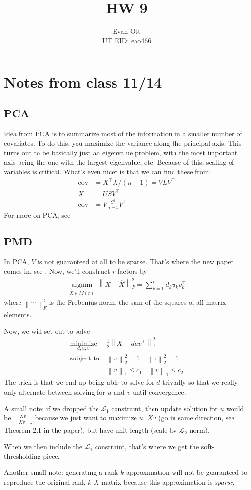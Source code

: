 \documentclass{article}
\title{\vspace{-6ex}HW 9\vspace{-2ex}}
\author{Evan Ott \\ UT EID: eao466\vspace{-2ex}}
\newcommand{\op}[2]{{\ensuremath{\underset{ #2 }{\operatorname{ #1 }}~}}}
\newcommand{\norm}[1]{{ \ensuremath{ \left\lVert  #1 \right\rVert  }  }}
\newcommand{\cov}{ \ensuremath{ \textrm{cov} } }
\begin{document}
\maketitle

\section{Notes from class 11/14}
\subsection{PCA}
Idea from PCA is to summarize most of the information in a smaller number of covariates. To do this,
you maximize the variance along the principal axis. This turns out to be basically just an eigenvalue problem,
with the most important axis being the one with the largest eigenvalue, etc. Because of this, scaling of variables
is critical. What's even nicer is that we can find these from:
\begin{align*}
\cov &= X^\top X / (n-1) = V L V^\top\\
X&=USV^\top\\
\cov &= V \frac{S^2}{n-1} V^\top
\end{align*}
For more on PCA, see \cite{james2013introduction}


\subsection{PMD}
In PCA, $V$ is not guaranteed at all to be sparse. 
That's where the new paper comes in, see \cite{witten2009penalized}.
Now, we'll construct $r$ factors by
\begin{align*}
\op{argmin}{\hat{X}\in M(r)}\norm{X-\hat{X}}_F^2 = \sum_{k=1}^r d_k u_k v_k^\top
\end{align*}
where $\norm{\cdots}_F^2$ is the Frobenius norm, the sum of the squares of all matrix elements.

Now, we will set out to solve
\begin{align*}
\op{minimize}{d,u,v} &\frac12 \norm{X-duv^\top}_F^2\\
\textrm{subject to} ~&\norm{u}_2^2=1~~~~\norm{v}_2^2=1\\
&\norm{u}_1\leq c_1~~~~\norm{v}_1\leq c_2
\end{align*}
The trick is that we end up being able to solve for $d$ trivially so that we really only alternate between solving for $u$ and $v$ until convergence.

A small note: if we dropped the $\mathcal{L}_1$ constraint, then update solution for $u$ would be $\frac{Xv}{\norm{Xv}_2}$ because we just want to maximize $u^\top Xv$ (go in same direction, see Theorem 2.1 in the paper), but have unit length (scale by $\mathcal{L}_2$ norm).

When we then include the $\mathcal{L}_1$ constraint, that's where we get the soft-thresholding piece.

Another small note: generating a rank-$k$ approximation will not be guaranteed to reproduce the original rank-$k$ $X$ matrix because this approximation is \emph{sparse}.



\end{document}
